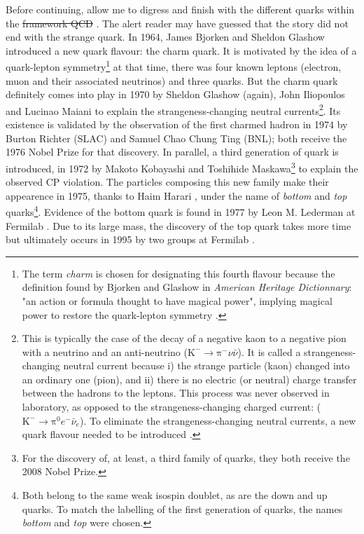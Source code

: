 \documentclass[ALICE,manyauthors]{cernphprep}
\newcommand{\piZero}        {\mbox{$\mathrm {\pi^0}$}}
\newcommand{\piMinus}       {\mbox{$\mathrm {\pi^-}$}}
\newcommand{\Kminus}     {\mbox{$\mathrm {K^-}$}\xspace}
\newcommand{\rmKminus}   {\Kminus}
\providecommand{\DIFaddtex}[1]{{\protect\color{blue}\uwave{#1}}} %
\providecommand{\DIFdeltex}[1]{{\protect\color{red}\sout{#1}}}                      %
\providecommand{\DIFaddbegin}{} %
\providecommand{\DIFaddend}{} %
\providecommand{\DIFdelbegin}{} %
\providecommand{\DIFdelend}{} %
\providecommand{\DIFadd}[1]{\texorpdfstring{\DIFaddtex{#1}}{#1}} %
\providecommand{\DIFdel}[1]{\texorpdfstring{\DIFdeltex{#1}}{}} %
\newcommand{\DIFscaledelfig}{0.5}
\newlength{\DIFdelgraphicswidth} %
\newlength{\DIFdelgraphicsheight} %
\newcommand{\DIFaddincludegraphics}[2][]{{\color{blue}\fbox{\DIFOincludegraphics[#1]{#2}}}} %
\newcommand{\DIFdelincludegraphics}[2][]{%
\sbox{\DIFdelgraphicsbox}{\DIFOincludegraphics[#1]{#2}}%
\settoboxwidth{\DIFdelgraphicswidth}{\DIFdelgraphicsbox} %
\settoboxtotalheight{\DIFdelgraphicsheight}{\DIFdelgraphicsbox} %
\scalebox{\DIFscaledelfig}{%
\parbox[b]{\DIFdelgraphicswidth}{\usebox{\DIFdelgraphicsbox}\\[-\baselineskip] \rule{\DIFdelgraphicswidth}{0em}}\llap{\resizebox{\DIFdelgraphicswidth}{\DIFdelgraphicsheight}{%
\setlength{\unitlength}{\DIFdelgraphicswidth}%
\begin{picture}(1,1)%
\thicklines\linethickness{2pt} %
{\color[rgb]{1,0,0}\put(0,0){\framebox(1,1){}}}%
{\color[rgb]{1,0,0}\put(0,0){\line( 1,1){1}}}%
{\color[rgb]{1,0,0}\put(0,1){\line(1,-1){1}}}%
\end{picture}%
}\hspace*{3pt}}} %
} %
\DeclareRobustCommand{\DIFaddbegin}{\DIFOaddbegin \let\includegraphics\DIFaddincludegraphics} %
\DeclareRobustCommand{\DIFaddend}{\DIFOaddend \let\includegraphics\DIFOincludegraphics} %
\DeclareRobustCommand{\DIFdelbegin}{\DIFOdelbegin \let\includegraphics\DIFdelincludegraphics} %
\DeclareRobustCommand{\DIFdelend}{\DIFOaddend \let\includegraphics\DIFOincludegraphics} %
\begin{document}
Before continuing, allow me to digress and finish with the different quarks within the \DIFdelbegin \DIFdel{framework QCD }\DIFdelend \DIFaddbegin \DIFadd{QCD framework}\DIFaddend . The alert reader may have guessed that the story did not end with the strange quark. In 1964, James Bjorken and Sheldon Glashow introduced a new quark flavour: the charm quark. It is motivated by the idea of a quark-lepton symmetry\footnote{The term \textit{charm} is chosen for designating this fourth flavour because the definition found by Bjorken and Glashow in \textit{American Heritage Dictionnary}: "an action or formula thought to have magical power", implying magical power to restore the quark-lepton symmetry \cite{s.glashowInteractionsJourneyMind1990}.} at that time, there was four known leptons (electron, muon and their associated neutrinos) and three quarks. But the charm quark definitely comes into play in 1970 by Sheldon Glashow (again), John Iliopoulos and Lucinao Maiani to explain the strangeness-changing neutral currents\footnote{This is typically the case of the decay of a negative kaon to a negative pion with a neutrino and an anti-neutrino ($\rmKminus \rightarrow \piMinus \nu \bar{\nu}$). It is called a strangeness-changing neutral current because i) the strange particle (kaon) changed into an ordinary one (pion), and ii) there is no electric (or neutral) charge transfer between the hadrons to the leptons. This process was never observed in laboratory, as opposed to the strangeness-changing charged current: ($\rmKminus \rightarrow \piZero e^{-} \bar{\nu}_{e}$). To eliminate the strangeness-changing neutral currents, a new quark flavour needed to be introduced \cite{s.glashowInteractionsJourneyMind1990}.}. Its existence is validated by the observation of the first charmed hadron in 1974 by Burton Richter (SLAC)\cite{augustinDiscoveryNarrowResonance1974} and Samuel Chao Chung Ting (BNL)\cite{aubertExperimentalObservationHeavy1974}; both receive the 1976 Nobel Prize for that discovery. In parallel, a third generation of quark is introduced, in 1972 by Makoto Kobayashi and Toshihide Maskawa\footnote{For the discovery of, at least, a third family of quarks, they both receive the 2008 Nobel Prize.} to explain the observed CP violation. The particles composing this new family make their appearence in 1975, thanks to Haim Harari \cite{harariNewQuarkModel1975}, under the name of \textit{bottom} and \textit{top} quarks\footnote{Both belong to the same weak isospin doublet, as are the down and up quarks. To match the labelling of the first generation of quarks, the names \textit{bottom} and \textit{top} were chosen.}. Evidence of the bottom quark is found in 1977 by Leon M. Lederman at Fermilab \cite{herbObservationDimuonResonance1977}. Due to its large mass, the discovery of the top quark takes more time but ultimately occurs in 1995 by two groups at Fermilab \cite{cdfcollaborationObservationTopQuark1995}\cite{d0collaborationObservationTopQuark1995}.
\end{document}
